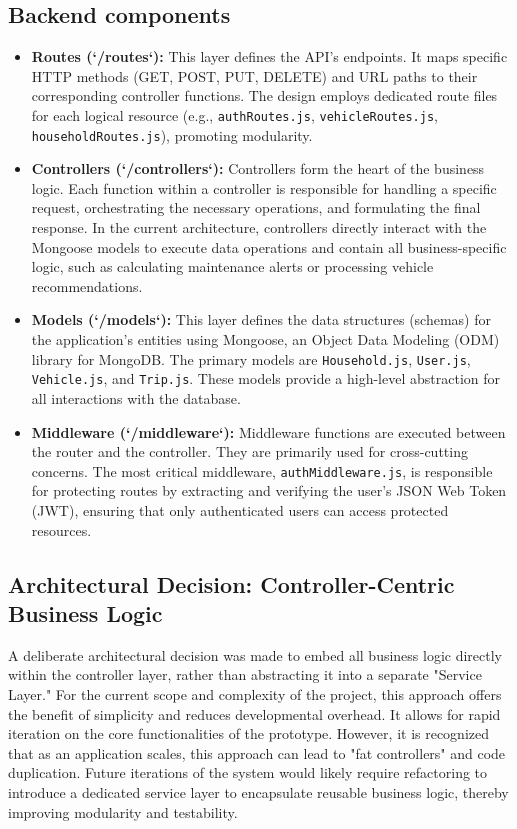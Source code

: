 \subsection{Backend components}
\begin{itemize}
    \item \textbf{Routes (`/routes`):} This layer defines the API's endpoints. It maps specific HTTP methods (GET, POST, PUT, DELETE) and URL paths to their corresponding controller functions. The design employs dedicated route files for each logical resource (e.g., \texttt{authRoutes.js}, \texttt{vehicleRoutes.js}, \texttt{householdRoutes.js}), promoting modularity.
    \textgap
    \item \textbf{Controllers (`/controllers`):} Controllers form the heart of the business logic. Each function within a controller is responsible for handling a specific request, orchestrating the necessary operations, and formulating the final response. In the current architecture, controllers directly interact with the Mongoose models to execute data operations and contain all business-specific logic, such as calculating maintenance alerts or processing vehicle recommendations.
    \textgap
    \item \textbf{Models (`/models`):} This layer defines the data structures (schemas) for the application's entities using Mongoose, an Object Data Modeling (ODM) library for MongoDB. The primary models are \texttt{Household.js}, \texttt{User.js}, \texttt{Vehicle.js}, and \texttt{Trip.js}. These models provide a high-level abstraction for all interactions with the database.
    \textgap
    \item \textbf{Middleware (`/middleware`):} Middleware functions are executed between the router and the controller. They are primarily used for cross-cutting concerns. The most critical middleware, \texttt{authMiddleware.js}, is responsible for protecting routes by extracting and verifying the user's JSON Web Token (JWT), ensuring that only authenticated users can access protected resources.
\end{itemize}

\subsection{Architectural Decision: Controller-Centric Business Logic}
A deliberate architectural decision was made to embed all business logic directly within the controller layer, rather than abstracting it into a separate "Service Layer." For the current scope and complexity of the project, this approach offers the benefit of simplicity and reduces developmental overhead. It allows for rapid iteration on the core functionalities of the prototype. However, it is recognized that as an application scales, this approach can lead to "fat controllers" and code duplication. Future iterations of the system would likely require refactoring to introduce a dedicated service layer to encapsulate reusable business logic, thereby improving modularity and testability.


